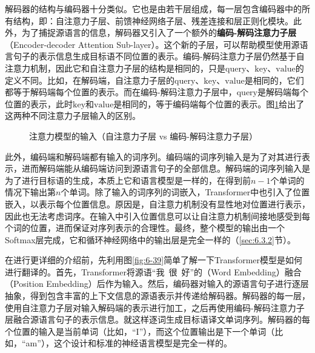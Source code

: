\parinterval 解码器的结构与编码器十分类似。它也是由若干层组成，每一层包含编码器中的所有结构，即：自注意力子层、前馈神经网络子层、残差连接和层正则化模块。此外，为了捕捉源语言的信息，解码器又引入了一个额外的{\small\sffamily\bfseries{编码-解码注意力子层}}（Encoder-decoder Attention Sub-layer）。这个新的子层，可以帮助模型使用源语言句子的表示信息生成目标语不同位置的表示。编码-解码注意力子层仍然基于自注意力机制，因此它和自注意力子层的结构是相同的，只是$\mathrm{query}$、$\mathrm{key}$、$\mathrm{value}$的定义不同。比如，在解码端，自注意力子层的$\mathrm{query}$、$\mathrm{key}$、$\mathrm{value}$是相同的，它们都等于解码端每个位置的表示。而在编码-解码注意力子层中，$\mathrm{query}$是解码端每个位置的表示，此时$\mathrm{key}$和$\mathrm{value}$是相同的，等于编码端每个位置的表示。图\ref{fig:6-40}给出了这两种不同注意力子层输入的区别。

\begin{figure}[htp]
    \centering
   
    \caption{ 注意力模型的输入（自注意力子层 vs 编码-解码注意力子层）}
    \label{fig:6-40}
\end{figure}

\parinterval 此外，编码端和解码端都有输入的词序列。编码端的词序列输入是为了对其进行表示，进而解码端能从编码端访问到源语言句子的全部信息。解码端的词序列输入是为了进行目标语的生成，本质上它和语言模型是一样的，在得到前$n-1$个单词的情况下输出第$n$个单词。除了输入的词序列的词嵌入，Transformer中也引入了位置嵌入，以表示每个位置信息。原因是，自注意力机制没有显性地对位置进行表示，因此也无法考虑词序。在输入中引入位置信息可以让自注意力机制间接地感受到每个词的位置，进而保证对序列表示的合理性。最终，整个模型的输出由一个Softmax层完成，它和循环神经网络中的输出层是完全一样的（\ref{sec:6.3.2}节）。

\parinterval 在进行更详细的介绍前，先利用图\ref{fig:6-39}简单了解一下Transformer模型是如何进行翻译的。首先，Transformer将源语``我\ 很\ 好''的{\small{}}（Word Embedding）融合{\small{}}（Position Embedding）后作为输入。然后，编码器对输入的源语言句子进行逐层抽象，得到包含丰富的上下文信息的源语表示并传递给解码器。解码器的每一层，使用自注意力子层对输入解码端的表示进行加工，之后再使用编码-解码注意力子层融合源语言句子的表示信息。就这样逐词生成目标语译文单词序列。解码器的每个位置的输入是当前单词（比如，``I''），而这个位置输出是下一个单词（比如，``am''），这个设计和标准的神经语言模型是完全一样的。

